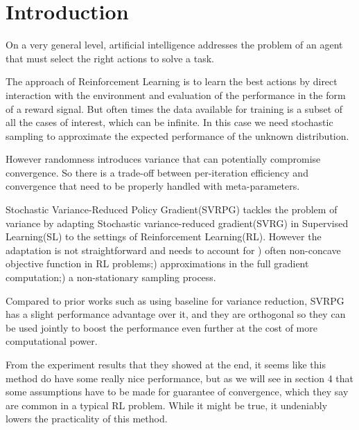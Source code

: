 \section{Introduction}
\label{section:intro}

\newcommand{\RNum}[1]{\uppercase\expandafter{\romannumeral #1\relax}}

On a very general level, artificial intelligence addresses the problem of an agent that must select the right actions to solve a task.

The approach of Reinforcement Learning is to learn the best actions by direct interaction with the environment and evaluation of the performance in the form of a reward signal. But often times the data available for training is a subset of all the cases of interest, which can be infinite. In this case we need stochastic sampling to approximate the expected performance of the unknown distribution.

However randomness introduces variance that can potentially compromise convergence. So there is a trade-off between per-iteration efficiency and convergence that need to be properly handled with meta-parameters.

Stochastic Variance-Reduced Policy Gradient(SVRPG) tackles the problem of variance by adapting Stochastic variance-reduced gradient(SVRG) in Supervised Learning(SL) to the settings of  Reinforcement Learning(RL). However the adaptation is not straightforward and needs to account for \RNum{1}) often non-concave objective function in RL problems;\RNum{2}) approximations in the full gradient computation;\RNum{3}) a non-stationary sampling process.

Compared to prior works such as using baseline for variance reduction, SVRPG has a slight performance advantage over it, and they are orthogonal so they can be used jointly to boost the performance even further at the cost of more computational power.

From the experiment results that they showed at the end, it seems like this method do have some really nice performance, but as we will see in section 4 that some assumptions have to be made for guarantee of convergence, which they say are common in a typical RL problem. While it might be true, it undeniably lowers the practicality of this method.